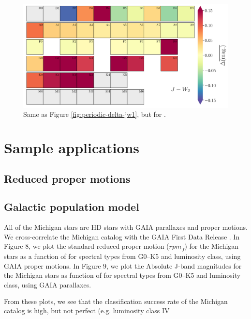 \begin{figure}
    \centering
    \includegraphics[width=1.0\textwidth,clip=true]{Figures/periodic/periodic-delta_J_W2.png}
    \caption{Same as Figure \ref{fig:periodic-delta-jw1}, but for \jwtwo.}
    \label{fig:periodic-delta-jw2}
\end{figure}

\section{Sample applications}
\subsection{Reduced proper motions}
\subsection{Galactic population model}

All of the Michigan stars are HD stars with GAIA parallaxes and proper motions.  We cross-correlate the Michigan catalog with the GAIA First Data Release \citep[]{gaia1,gaia2,Lindegren2016}.  In Figure 8, we plot the standard reduced proper motion (${rpm}_J$) for the Michigan stars as a function of \jwtwo for spectral types from G0--K5 and luminosity class, using GAIA proper motions.  In Figure 9, we plot the Absolute J-band magnitudes for the Michigan stars as function of \jwtwo for spectral types from G0--K5 and luminosity class, using GAIA parallaxes.

From these plots, we see that the classification success rate of the Michigan catalog is high, but not perfect (e.g. luminosity class IV 


